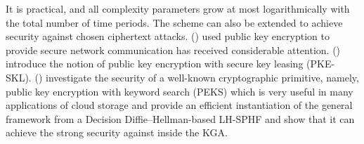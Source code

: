 \documentclass[graybox]{svmult}
\begin{document}
It is practical, and all complexity parameters grow at most logarithmically with the total number of time periods.
The scheme can also be extended to achieve security against chosen ciphertext attacks.
\citeauthor{dolev1983security} (\citeyear{dolev1983security}) used public key encryption to provide secure network communication has received considerable attention.
\citeauthor{agrawal2023public} (\citeyear{agrawal2023public}) introduce the notion of public key encryption with secure key leasing (PKE-SKL).
\citeauthor{chen2016dual} (\citeyear{chen2016dual}) investigate the security of a well-known cryptographic primitive, namely, public key encryption with keyword search (PEKS) which is very useful in many applications of cloud storage and provide an efficient instantiation of the general framework from a Decision Diffie–Hellman-based LH-SPHF and show that it can achieve the strong security against inside the KGA.
\end{document}
